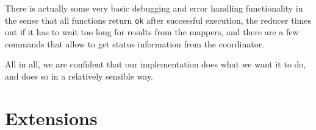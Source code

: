 \documentclass[a4paper]{article}
\begin{document}
There is actually some very basic debugging and error handling functionality in the sense that all functions return \texttt{ok} after successful execution, the reducer times out if it has to wait too long for results from the mappers, and there are a few commands that allow to get status information from the coordinator.

All in all, we are confident that our implementation does what we want it to do, and does so in a relatively sensible way.

\section*{Extensions}
\end{document}
